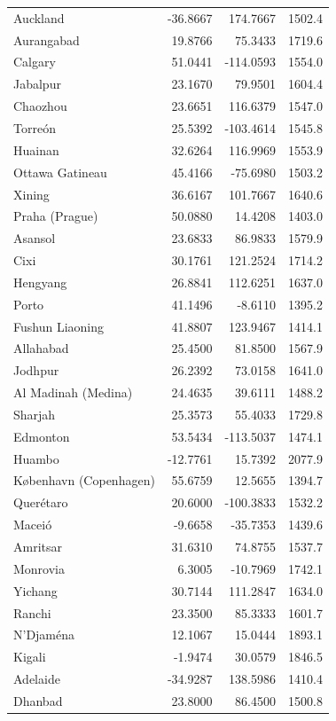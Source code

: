 \begin{longtable}{lrrc}
Auckland & -36.8667 & 174.7667 & 1502.4 \\
Aurangabad & 19.8766 & 75.3433 & 1719.6 \\
Calgary & 51.0441 & -114.0593 & 1554.0 \\
Jabalpur & 23.1670 & 79.9501 & 1604.4 \\
Chaozhou & 23.6651 & 116.6379 & 1547.0 \\
Torreón & 25.5392 & -103.4614 & 1545.8 \\
Huainan & 32.6264 & 116.9969 & 1553.9 \\
Ottawa Gatineau & 45.4166 & -75.6980 & 1503.2 \\
Xining & 36.6167 & 101.7667 & 1640.6 \\
Praha (Prague) & 50.0880 & 14.4208 & 1403.0 \\
Asansol & 23.6833 & 86.9833 & 1579.9 \\
Cixi & 30.1761 & 121.2524 & 1714.2 \\
Hengyang & 26.8841 & 112.6251 & 1637.0 \\
Porto & 41.1496 & -8.6110 & 1395.2 \\
Fushun  Liaoning & 41.8807 & 123.9467 & 1414.1 \\
Allahabad & 25.4500 & 81.8500 & 1567.9 \\
Jodhpur & 26.2392 & 73.0158 & 1641.0 \\
Al Madinah (Medina) & 24.4635 & 39.6111 & 1488.2 \\
Sharjah & 25.3573 & 55.4033 & 1729.8 \\
Edmonton & 53.5434 & -113.5037 & 1474.1 \\
Huambo & -12.7761 & 15.7392 & 2077.9 \\
København (Copenhagen) & 55.6759 & 12.5655 & 1394.7 \\
Querétaro & 20.6000 & -100.3833 & 1532.2 \\
Maceió & -9.6658 & -35.7353 & 1439.6 \\
Amritsar & 31.6310 & 74.8755 & 1537.7 \\
Monrovia & 6.3005 & -10.7969 & 1742.1 \\
Yichang & 30.7144 & 111.2847 & 1634.0 \\
Ranchi & 23.3500 & 85.3333 & 1601.7 \\
N'Djaména & 12.1067 & 15.0444 & 1893.1 \\
Kigali & -1.9474 & 30.0579 & 1846.5 \\
Adelaide & -34.9287 & 138.5986 & 1410.4 \\
Dhanbad & 23.8000 & 86.4500 & 1500.8 \\

\end{longtable}
